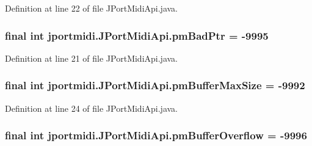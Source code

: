 Definition at line 22 of file J\+Port\+Midi\+Api.\+java.

\subsubsection[{\texorpdfstring{pm\+Bad\+Ptr}{pmBadPtr}}]{\setlength{\rightskip}{0pt plus 5cm}final {\bf int} jportmidi.\+J\+Port\+Midi\+Api.\+pm\+Bad\+Ptr = -\/9995}\hypertarget{classjportmidi_1_1_j_port_midi_api_a164e6579140b264078a3db35905d0c2b}{}\label{classjportmidi_1_1_j_port_midi_api_a164e6579140b264078a3db35905d0c2b}


Definition at line 21 of file J\+Port\+Midi\+Api.\+java.

\subsubsection[{\texorpdfstring{pm\+Buffer\+Max\+Size}{pmBufferMaxSize}}]{\setlength{\rightskip}{0pt plus 5cm}final {\bf int} jportmidi.\+J\+Port\+Midi\+Api.\+pm\+Buffer\+Max\+Size = -\/9992}\hypertarget{classjportmidi_1_1_j_port_midi_api_a90558228ef8f37f82f4825e56e83fe66}{}\label{classjportmidi_1_1_j_port_midi_api_a90558228ef8f37f82f4825e56e83fe66}


Definition at line 24 of file J\+Port\+Midi\+Api.\+java.

\subsubsection[{\texorpdfstring{pm\+Buffer\+Overflow}{pmBufferOverflow}}]{\setlength{\rightskip}{0pt plus 5cm}final {\bf int} jportmidi.\+J\+Port\+Midi\+Api.\+pm\+Buffer\+Overflow = -\/9996}\hypertarget{classjportmidi_1_1_j_port_midi_api_ac49c91b0ef675659972ab9e200932a83}{}\label{classjportmidi_1_1_j_port_midi_api_ac49c91b0ef675659972ab9e200932a83}


